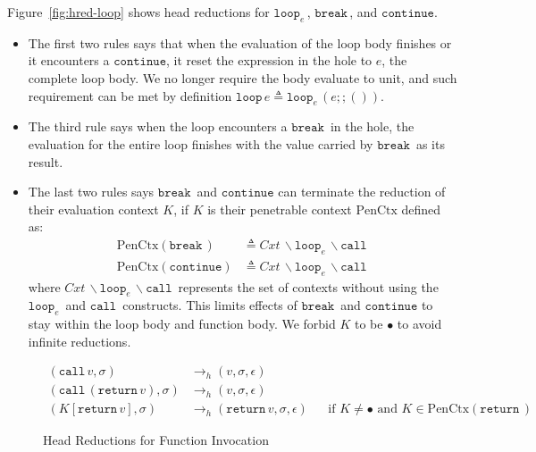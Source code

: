 \documentclass{article}
\numberwithin{algorithm}{section}
\newcommand{\cmdloop}[1]{\texttt{loop}_{#1}\,}
\newcommand{\cmdbreak}{\texttt{break}\,}
\newcommand{\cmdcontinue}{\texttt{continue}}
\newcommand{\cmdreturn}{\texttt{return}\,}
\newcommand{\cmdcall}{\texttt{call}\,}
\newcommand{\pure}[1]{\text{PenCtx}(#1)}
\newcommand{\hred}{\rightarrow_h}
\begin{document}
Figure~\ref{fig:hred-loop} shows head reductions for $\cmdloop{e}\!$, $\cmdbreak\!$, and $\cmdcontinue$.
\begin{itemize}
\item The first two rules says that when the evaluation of the loop body finishes or it encounters a $\cmdcontinue$, it reset the expression in the hole to $e$, the complete loop body. We no longer require the body evaluate to unit, and such requirement can be met by definition $\texttt{loop}\, e \triangleq \cmdloop{e} (e ;; ())$.
\item The third rule says when the loop encounters a $\cmdbreak\!$ in the hole, the evaluation for the entire loop finishes with the value carried by $\cmdbreak\!$ as its result.
\item The last two rules says $\cmdbreak\!$ and $\cmdcontinue$ can terminate the reduction of their evaluation context $K$, if $K$ is their penetrable context $\text{PenCtx}$ defined as:
$$
\begin{aligned}
    \pure{\cmdbreak\!} &\triangleq \textit{Cxt}\,\backslash\cmdloop{e}\!\backslash\cmdcall \\
    \pure{\cmdcontinue} &\triangleq \textit{Cxt}\,\backslash\cmdloop{e}\!\backslash\cmdcall
\end{aligned}
$$
where $\textit{Cxt}\,\backslash\cmdloop{e}\!\backslash\cmdcall\!$ represents the set of contexts without using the $\cmdloop{e}\!$ and $\cmdcall\!$ constructs.
This limits effects of $\cmdbreak\!$ and $\cmdcontinue$ to stay within the loop body and function body.
We forbid $K$ to be $\bullet$ to avoid infinite reductions.
\end{itemize}

\begin{figure}[h]
$$
\begin{aligned}
    (\cmdcall v, \sigma) &\hred (v, \sigma, \epsilon) \\
    (\cmdcall (\cmdreturn v), \sigma) &\hred (v, \sigma, \epsilon) \\
    (K[\cmdreturn v], \sigma) &\hred (\cmdreturn v, \sigma, \epsilon) && \text{if } K \neq \bullet \text{ and } K \in \pure{\cmdreturn\!}
\end{aligned}
$$
\caption{Head Reductions for Function Invocation}
\label{fig:hred-func}
\end{figure}
\end{document}
